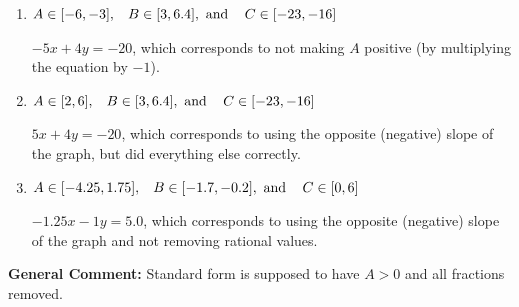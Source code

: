 \documentclass{extbook}[14pt]
\begin{document}
\begin{enumerate}
{\begin{enumerate}[label=\Alph*.]
* $5x - 4y = 20$, which is the correct option.
\item \( A \in [-6, -3], \hspace{3mm} B \in [3, 6.4], \text{ and } \hspace{3mm} C \in [-23, -16] \)

 $-5x + 4y = -20$, which corresponds to not making $A$ positive (by multiplying the equation by $-1$).
\item \( A \in [2, 6], \hspace{3mm} B \in [3, 6.4], \text{ and } \hspace{3mm} C \in [-23, -16] \)

 $5x + 4y = -20$, which corresponds to using the opposite (negative) slope of the graph, but did everything else correctly.
\item \( A \in [-4.25, 1.75], \hspace{3mm} B \in [-1.7, -0.2], \text{ and } \hspace{3mm} C \in [0, 6] \)

 $-1.25x - 1y = 5.0$, which corresponds to using the opposite (negative) slope of the graph and not removing rational values.
\end{enumerate}

\textbf{General Comment:} Standard form is supposed to have $A > 0$ and all fractions removed.
}
\end{enumerate}
\end{document}
